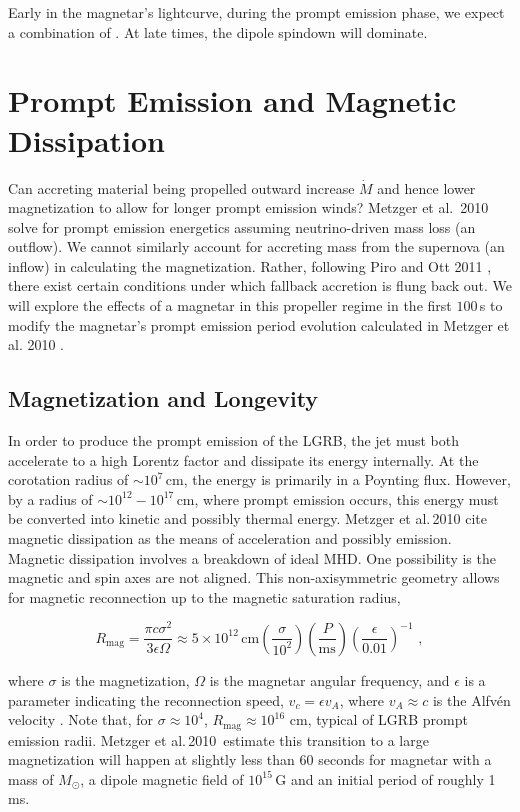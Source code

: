\documentclass{article}
\begin{document}
Early in the magnetar's lightcurve, during the prompt emission phase, we expect a combination of . At late times, the dipole spindown will dominate.

\section{Prompt Emission and Magnetic Dissipation} \label{sec:prompt}
Can accreting material being propelled outward increase $\dot{M}$ and hence lower magnetization to allow for longer prompt emission winds?  Metzger et al.\ 2010 \cite{Metzger:2010pp} solve for prompt emission energetics assuming neutrino-driven mass loss (an outflow). We cannot similarly account for accreting mass from the supernova (an inflow) in calculating the magnetization. Rather, following Piro and Ott 2011 \cite {Piro:2011ed}, there exist certain conditions under which fallback accretion is flung back out. We will explore the effects of a magnetar in this propeller regime in the first $100$\,s to modify the magnetar's prompt emission period evolution calculated in  Metzger et al. 2010 \cite{Metzger:2010pp}.

\subsection{Magnetization and Longevity}

In order to produce the prompt emission of the LGRB, the jet must both accelerate to a high Lorentz factor and dissipate its energy internally. At the corotation radius of $\sim 10^7$\,cm, the energy is primarily in a Poynting flux. However, by a radius of $\sim 10^{12}- 10^{17}$\,cm, where prompt emission occurs, this energy must be converted into kinetic and possibly thermal energy.  Metzger et al.\,2010 \cite{Metzger:2010pp} cite  magnetic dissipation as the means of acceleration and possibly emission. Magnetic dissipation involves a breakdown of ideal MHD. One possibility is the magnetic and spin axes are not aligned. This non-axisymmetric geometry allows for magnetic reconnection up to the magnetic saturation radius,

\begin{equation}
  R_{\mathrm{mag}}=\frac{\pi c \sigma^2}{3 \epsilon \Omega}\approx 5 \times 10^{12}\, \mathrm{cm} \left(\frac{\sigma}{10^2}\right) \left(\frac{P}{\mathrm{ms}}\right)\left(\frac{\epsilon}{0.01}\right)^{-1}\,\,,
\end{equation}

where $\sigma$ is the magnetization, $\Omega$ is the magnetar angular frequency, and $\epsilon$ is a parameter indicating the reconnection speed, $v_c=\epsilon v_A$, where $v_A \approx c$ is the Alfv\'en velocity \cite{Metzger:2010pp}. Note that, for $\sigma\approx 10^4$, $R_{\mathrm{mag}} \approx 10^{16}$ cm, typical of LGRB prompt emission radii. Metzger et al.\,2010\,\cite{Metzger:2010pp} estimate this transition to a large magnetization will happen at slightly less than 60 seconds for magnetar with a mass of $M_{\odot}$, a dipole  magnetic field of $10^{15}$\,G and an initial period of roughly 1 ms.
\end{document}
